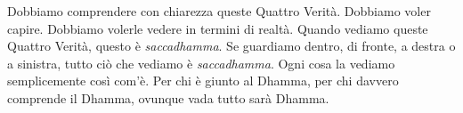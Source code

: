 Dobbiamo comprendere con chiarezza queste Quattro Verità. Dobbiamo voler
capire. Dobbiamo volerle vedere in termini di realtà. Quando vediamo
queste Quattro Verità, questo è \emph{saccadhamma}. Se guardiamo dentro,
di fronte, a destra o a sinistra, tutto ciò che vediamo è
\emph{saccadhamma}. Ogni cosa la vediamo semplicemente così com'è. Per
chi è giunto al Dhamma, per chi davvero comprende il Dhamma, ovunque
vada tutto sarà Dhamma.

